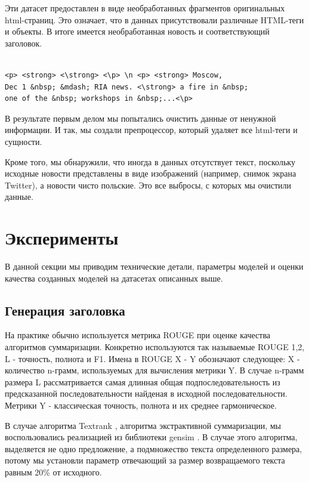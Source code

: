 \documentclass[14pt]{matmex-diploma-custom}
\begin{document}
Эти датасет предоставлен в виде необработанных фрагментов оригинальных html-страниц.
Это означает, что в данных присутствовали различные HTML-теги и объекты.
В итоге имеется необработанная новость и соответствующий заголовок.

\begin{verbatim}

<p> <strong> <\strong> <\p> \n <p> <strong> Moscow,
Dec 1 &nbsp; &mdash; RIA news. <\strong> a fire in &nbsp;
one of the &nbsp; workshops in &nbsp;...<\p>
\end{verbatim}

В результате первым делом мы попытались очистить данные от ненужной информации. И так, мы создали препроцессор, который удаляет все html-теги и сущности.

Кроме того, мы обнаружили, что иногда в данных отсутствует текст, поскольку исходные новости представлены в виде изображений (например, снимок экрана Twitter), а новости чисто польские. Это все выбросы, с которых мы очистили данные.


\section{Эксперименты}
В данной секции мы приводим технические детали, параметры моделей и оценки качества созданных моделей на датасетах описанных выше.

\subsection{Генерация заголовка}
На практике обычно используется метрика ROUGE \cite{Lin: 2004} при оценке качества алгоритмов суммаризации. Конкретно используются так называемые ROUGE 1,2, L - точность, полнота и F1. Имена в ROUGE X - Y обозначают следующее: X - количество n-грамм, используемых для вычисления метрики Y. В случае n-грамм размера L рассматривается самая длинная общая подпоследовательность из предсказанной последовательности найденая в исходной последовательности. Метрики Y - классическая точность, полнота и их среднее гармоническое.

В случае алгоритма Textrank \cite{DBLP:journals/corr/BarriosLAW16}, алгоритма экстрактивной суммаризации, мы воспользовались реализацией из библиотеки gensim \cite{rehurek_lrec}. В случае этого алгоритма, выделяется не одно предложение, а подмножество текста определенного размера, потому мы установли параметр отвечающий за размер возвращаемого текста равным 20\% от исходного.
\end{document}
